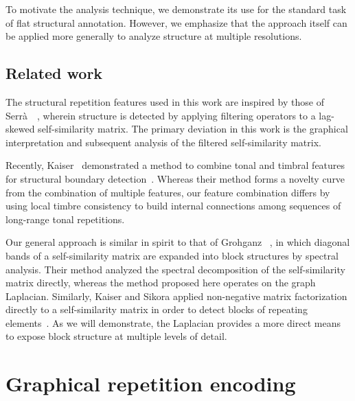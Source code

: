 \documentclass{article}
\begin{document}
To motivate the analysis technique, we demonstrate its use for the
standard task of flat structural annotation.  However, we emphasize that the approach
itself can be applied more generally to analyze structure at multiple resolutions.

\subsection{Related work}

The structural repetition features used in this work are inspired by those of
Serr\`{a}~\etal~\cite{serra2014unsupervised}, wherein structure is detected by 
applying filtering operators to a lag-skewed self-similarity matrix.  The primary
deviation in this work is the graphical interpretation and subsequent analysis of 
the filtered self-similarity matrix.

Recently, Kaiser~\etal{} demonstrated a method to combine tonal and timbral features for
structural boundary detection~\cite{kaiser2013simple}.  Whereas their method forms a
novelty curve from the combination of multiple features, our feature combination
differs by using local timbre consistency to build internal connections among 
sequences of long-range tonal repetitions.

Our general approach is similar in spirit to that of Grohganz 
\etal~\cite{grohganz2013converting}, in which diagonal bands 
of a self-similarity matrix are expanded into block structures by 
spectral analysis.  Their method analyzed the spectral decomposition of the 
self-similarity matrix directly, whereas the method proposed here operates on the
graph Laplacian.  Similarly, Kaiser and Sikora applied non-negative matrix
factorization directly to a self-similarity matrix in order to detect blocks of
repeating elements~\cite{kaiser2010music}.  
As we will demonstrate, the Laplacian provides a more direct means to
expose block structure at multiple levels of detail.

\section{Graphical repetition encoding}
\end{document}
